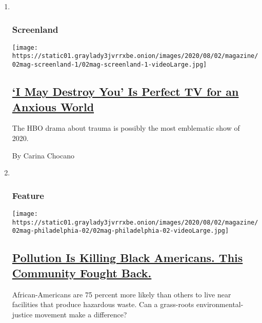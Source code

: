 \begin{enumerate}
\def\labelenumi{\arabic{enumi}.}
\item ~
  \hypertarget{screenland}{%
  \subsubsection{Screenland}\label{screenland}}

  \texttt{[image: https://static01.graylady3jvrrxbe.onion/images/2020/08/02/magazine/02mag-screenland-1/02mag-screenland-1-videoLarge.jpg]}

  \hypertarget{i-may-destroy-you-is-perfect-tv-for-an-anxious-world}{%
  \subsection{\texorpdfstring{\href{/2020/07/29/magazine/i-may-destroy-you-hbo-michaela-coel.html}{`I
  May Destroy You' Is Perfect TV for an Anxious
  World}}{`I May Destroy You' Is Perfect TV for an Anxious World}}\label{i-may-destroy-you-is-perfect-tv-for-an-anxious-world}}

  The HBO drama about trauma is possibly the most emblematic show of
  2020.

  By Carina Chocano
\item ~
  \hypertarget{feature-2}{%
  \subsubsection{Feature}\label{feature-2}}

  \texttt{[image: https://static01.graylady3jvrrxbe.onion/images/2020/08/02/magazine/02mag-philadelphia-02/02mag-philadelphia-02-videoLarge.jpg]}

  \hypertarget{pollution-is-killing-black-americans-this-community-fought-back}{%
  \subsection{\texorpdfstring{\href{/2020/07/28/magazine/pollution-philadelphia-black-americans.html}{Pollution
  Is Killing Black Americans. This Community Fought
  Back.}}{Pollution Is Killing Black Americans. This Community Fought Back.}}\label{pollution-is-killing-black-americans-this-community-fought-back}}

  African-Americans are 75 percent more likely than others to live near
  facilities that produce hazardous waste. Can a grass-roots
  environmental-justice movement make a difference?


\end{enumerate}
